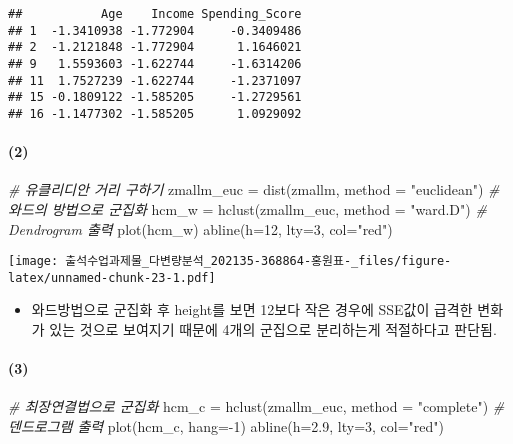 \documentclass[
]{article}
\newenvironment{Shaded}{\begin{snugshade}}{\end{snugshade}}
\newcommand{\AttributeTok}[1]{\textcolor[rgb]{0.77,0.63,0.00}{#1}}
\newcommand{\CommentTok}[1]{\textcolor[rgb]{0.56,0.35,0.01}{\textit{#1}}}
\newcommand{\DecValTok}[1]{\textcolor[rgb]{0.00,0.00,0.81}{#1}}
\newcommand{\FloatTok}[1]{\textcolor[rgb]{0.00,0.00,0.81}{#1}}
\newcommand{\FunctionTok}[1]{\textcolor[rgb]{0.00,0.00,0.00}{#1}}
\newcommand{\NormalTok}[1]{#1}
\newcommand{\OtherTok}[1]{\textcolor[rgb]{0.56,0.35,0.01}{#1}}
\newcommand{\SpecialCharTok}[1]{\textcolor[rgb]{0.00,0.00,0.00}{#1}}
\newcommand{\StringTok}[1]{\textcolor[rgb]{0.31,0.60,0.02}{#1}}
\providecommand{\tightlist}{%
  \setlength{\itemsep}{0pt}\setlength{\parskip}{0pt}}
\begin{document}
\begin{verbatim}
##           Age    Income Spending_Score
## 1  -1.3410938 -1.772904     -0.3409486
## 2  -1.2121848 -1.772904      1.1646021
## 9   1.5593603 -1.622744     -1.6314206
## 11  1.7527239 -1.622744     -1.2371097
## 15 -0.1809122 -1.585205     -1.2729561
## 16 -1.1477302 -1.585205      1.0929092
\end{verbatim}

\hypertarget{section-6}{%
\paragraph{(2)}\label{section-6}}

\begin{Shaded}
\begin{Highlighting}[]
\CommentTok{\# 유클리디안 거리 구하기}
\NormalTok{zmallm\_euc }\OtherTok{=} \FunctionTok{dist}\NormalTok{(zmallm, }\AttributeTok{method =} \StringTok{"euclidean"}\NormalTok{)}
\CommentTok{\# 와드의 방법으로 군집화}
\NormalTok{hcm\_w }\OtherTok{=} \FunctionTok{hclust}\NormalTok{(zmallm\_euc, }\AttributeTok{method =} \StringTok{"ward.D"}\NormalTok{)}
\CommentTok{\# Dendrogram 출력}
\FunctionTok{plot}\NormalTok{(hcm\_w)}
\FunctionTok{abline}\NormalTok{(}\AttributeTok{h=}\DecValTok{12}\NormalTok{, }\AttributeTok{lty=}\DecValTok{3}\NormalTok{, }\AttributeTok{col=}\StringTok{"red"}\NormalTok{)}
\end{Highlighting}
\end{Shaded}

\texttt{[image: 출석수업과제물\_다변량분석\_202135-368864-홍원표-\_files/figure-latex/unnamed-chunk-23-1.pdf]}

\begin{itemize}
\tightlist
\item
  와드방법으로 군집화 후 height를 보면 12보다 작은 경우에 SSE값이 급격한
  변화가 있는 것으로 보여지기 때문에 4개의 군집으로 분리하는게
  적절하다고 판단됨.
\end{itemize}

\hypertarget{section-7}{%
\paragraph{(3)}\label{section-7}}

\begin{Shaded}
\begin{Highlighting}[]
\CommentTok{\# 최장연결법으로 군집화}
\NormalTok{hcm\_c }\OtherTok{=} \FunctionTok{hclust}\NormalTok{(zmallm\_euc, }\AttributeTok{method =} \StringTok{"complete"}\NormalTok{)}
\CommentTok{\# 덴드로그램 출력}
\FunctionTok{plot}\NormalTok{(hcm\_c, }\AttributeTok{hang=}\SpecialCharTok{{-}}\DecValTok{1}\NormalTok{)}
\FunctionTok{abline}\NormalTok{(}\AttributeTok{h=}\FloatTok{2.9}\NormalTok{, }\AttributeTok{lty=}\DecValTok{3}\NormalTok{, }\AttributeTok{col=}\StringTok{"red"}\NormalTok{)}
\end{Highlighting}
\end{Shaded}
\end{document}
